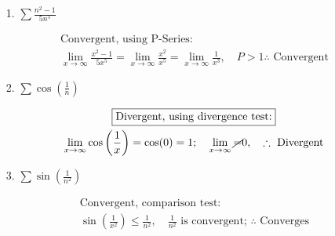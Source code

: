     \begin{itemize}
        \item [1.]
        $\sum\frac{n^{2}-1}{5n^{5}}$
        \\
        \begin{mdframed}
            \begin{equation*}
                \begin{gathered}
                    \boxed{\text{Convergent, using P-Series:}}                      \\
                      \lim_{x \to \infty}\frac{x^{2}-1}{5x^{5}}
                    = \lim_{x \to \infty}\frac{x^{2}}{x^{5}} 
                    = \lim_{x \to \infty}\frac{1}{x^{3}}, \quad 
                    P > 1 \therefore \text{ Convergent}
                \end{gathered}
            \end{equation*}
        \end{mdframed}
    
        \item [2.]
        $\sum\cos\left(\frac{1}{n}\right)$
        \\
        \begin{mdframed}
            \begin{equation*}
                \begin{gathered}
                    \boxed{\text{Divergent, using divergence test:}}                \\
                    \lim_{x \to \infty} \cos\left(\frac{1}{x}\right) = \cos(0) = 1;
                    \quad \lim_{x \to \infty} \cancel{=} 0, \quad \therefore 
                    \text{ Divergent}
                \end{gathered}
            \end{equation*}
        \end{mdframed}

        \item [3.]
        $\sum\sin\left(\frac{1}{n^{2}}\right)$
        \\
        \begin{mdframed}
            \begin{equation*}
                \begin{gathered}
                    \boxed{\text{Convergent, comparison test:}}                       \\
                    \sin\left(\frac{1}{x^{2}}\right) \leq \frac{1}{n^{2}},
                    \quad \frac{1}{n^{2}} \text{ is convergent; } \therefore
                    \text{ Converges}
                \end{gathered}
            \end{equation*}
        \end{mdframed}


\end{itemize}

